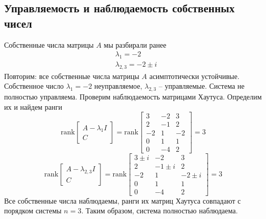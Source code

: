 \documentclass[a4paper, 12pt]{article}
\begin{document}
    \subsection{Управляемость и наблюдаемость собственных чисел}
    Собственные числа матрицы $A$ мы разбирали ранее
    \begin{align*}
        &\lambda_1=-2\\
        &\lambda_{2,3}=-2\pm i
    \end{align*}
    Повторим: все собственные числа матрицы $A$ асимптотически устойчивые.
    Собственное число $\lambda_1=-2$ неуправляемое, $\lambda_{2,3}$ -- управляемые.
    Система не полностью управляема. Проверим наблюдаемость матрицами Хаутуса. Определим их и найдем ранги
    $$
    \text{rank}\begin{bmatrix}
        A-\lambda_1 I\\
        C
    \end{bmatrix}=\text{rank}\begin{bmatrix}
    3   &-2    &3\\
    2   &-1    &2\\
   -2    &1   &-2\\
    0    &1    &1\\
    0   &-4    &2
    \end{bmatrix}=3
    $$
    $$
    \text{rank}\begin{bmatrix}
        A-\lambda_{2,3} I\\
        C
    \end{bmatrix}=\text{rank}\begin{bmatrix}
    3\pm i  &-2   &3\\
   2  &-1\pm i   &2\\
  -2   &1  &-2\pm i\\
   0   &1   &1\\
   0  &-4   &2
    \end{bmatrix}=3
    $$
    Все собственные числа наблюдаемы, ранги их матриц Хаутуса совпадают с порядком системы $n=3$.
    Таким образом, система полностью наблюдаема.
\end{document}
